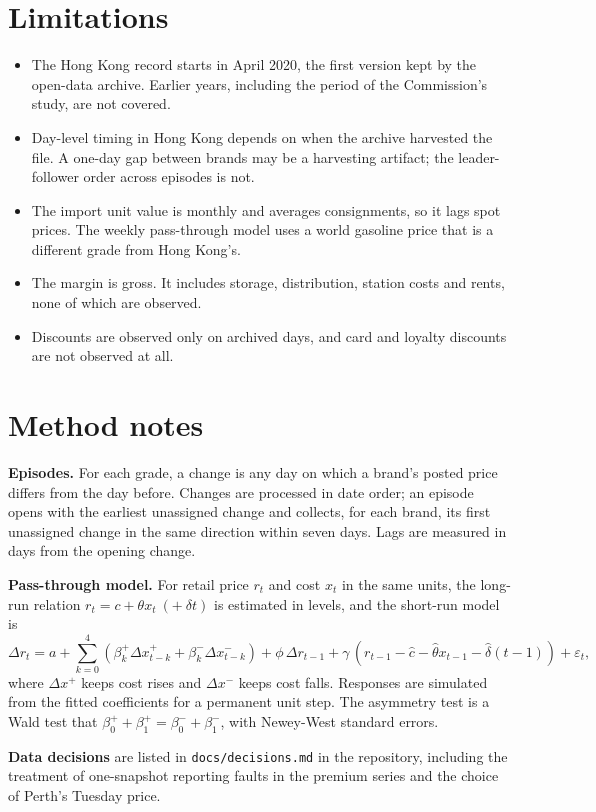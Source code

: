 \documentclass[11pt]{article}
\begin{document}
\section{Limitations}

\begin{itemize}
\item The Hong Kong record starts in April 2020, the first version kept by the open-data archive. Earlier years, including the period of the Commission's study, are not covered.
\item Day-level timing in Hong Kong depends on when the archive harvested the file. A one-day gap between brands may be a harvesting artifact; the leader-follower order across \hkEpisodes{} episodes is not.
\item The import unit value is monthly and averages consignments, so it lags spot prices. The weekly pass-through model uses a world gasoline price that is a different grade from Hong Kong's.
\item The margin is gross. It includes storage, distribution, station costs and rents, none of which are observed.
\item Discounts are observed only on archived days, and card and loyalty discounts are not observed at all.
\end{itemize}

\appendix
\section{Method notes}

\textbf{Episodes.} For each grade, a change is any day on which a brand's posted price differs from the day before. Changes are processed in date order; an episode opens with the earliest unassigned change and collects, for each brand, its first unassigned change in the same direction within seven days. Lags are measured in days from the opening change.

\textbf{Pass-through model.} For retail price $r_t$ and cost $x_t$ in the same units, the long-run relation $r_t = c + \theta x_t\ (+\ \delta t)$ is estimated in levels, and the short-run model is
\[
\Delta r_t = a + \sum_{k=0}^{4} \left(\beta_k^{+}\Delta x^{+}_{t-k} + \beta_k^{-}\Delta x^{-}_{t-k}\right) + \phi\,\Delta r_{t-1} + \gamma\,(r_{t-1} - \hat c - \hat\theta x_{t-1} - \hat\delta (t-1)) + \varepsilon_t,
\]
where $\Delta x^{+}$ keeps cost rises and $\Delta x^{-}$ keeps cost falls. Responses are simulated from the fitted coefficients for a permanent unit step. The asymmetry test is a Wald test that $\beta_0^{+}+\beta_1^{+} = \beta_0^{-}+\beta_1^{-}$, with Newey-West standard errors.

\textbf{Data decisions} are listed in \texttt{docs/decisions.md} in the repository, including the treatment of one-snapshot reporting faults in the premium series and the choice of Perth's Tuesday price.

\printbibliography[title=References]
\end{document}
